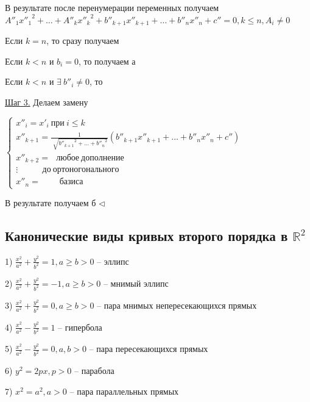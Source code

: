 В результате после перенумерации переменных получаем $A''_1 {x''_1}^2 + \dots + A''_k {x''_k}^2 + b''_{k+1} x''_{k+1} + \dots + b''_n x''_n + c'' = 0, k \leqslant n, A_i \neq 0$

Если $k = n$, то сразу получаем 

Если $k < n$ и $b_i = 0$, то получаем а

Если $k < n$ и $\exists \ b''_i \neq 0$, то

\vspace{\baselineskip}
\underline{Шаг 3.} Делаем замену

$\begin{cases} x''_i = x'_i \ при \ i \leqslant k \\ x''_{k+1} = \frac{1}{\sqrt[]{{b''_{k+1}}^2 + \dots + {b''_n}^2}}(b''_{k+1} x''_{k+1} + \dots + b''_n x''_n + c'') \\ 
x''_{k + 2} = \ \ \ любое \ дополнение \\ 
\vdots \ \ \ \ \ \ \ \  \ \ \ \ \ до \ ортоногонального \\
x''_n = \ \ \  \ \ \ \ \ \ \ базиса
\end{cases}$

В результате получаем б $\lhd$

\subsection{Канонические виды кривых второго порядка в $\mathbb{R}^2$}

1) $\frac{x^2}{a^2} + \frac{y^2}{b^2} = 1, a\geqslant b > 0$ -- эллипс

\vspace{\baselineskip}
2) $\frac{x^2}{a^2} + \frac{y^2}{b^2} = -1, a\geqslant b > 0$ -- мнимый эллипс

\vspace{\baselineskip}
3) $\frac{x^2}{a^2} + \frac{y^2}{b^2} = 0, a\geqslant b > 0$ -- пара мнимых непересекающихся прямых

\vspace{\baselineskip}
4) $\frac{x^2}{a^2} - \frac{y^2}{b^2} = 1$ -- гипербола

\vspace{\baselineskip}
5) $\frac{x^2}{a^2} - \frac{y^2}{b^2} = 0, a, b > 0$ -- пара пересекающихся прямых

\vspace{\baselineskip}
6) $y^2 = 2px, p > 0$ -- парабола

\vspace{\baselineskip}
7) $x^2 = a^2, a > 0$ -- пара параллельных прямых

